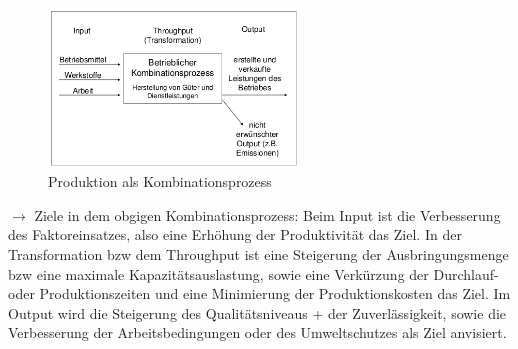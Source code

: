\documentclass[11pt]{article}
\begin{document}
\begin{figure}[htbp]
\centering
\includegraphics[width=250px]{./pictures/produktion_als_kombpr.png}
\caption{Produktion als Kombinationsprozess}
\end{figure} 

\(\rightarrow\) Ziele in dem obgigen Kombinationsprozess:
Beim Input ist die Verbesserung des Faktoreinsatzes, also eine Erhöhung der Produktivität das Ziel.
In der Transformation bzw dem Throughput ist eine Steigerung der Ausbringungsmenge bzw eine maximale Kapazitätsauslastung, sowie eine Verkürzung der Durchlauf- oder Produktionszeiten und eine Minimierung der Produktionskosten das Ziel.
Im Output wird die Steigerung des Qualitätsniveaus + der Zuverlässigkeit, sowie die Verbesserung der Arbeitsbedingungen oder des Umweltschutzes als Ziel anvisiert.
\end{document}
